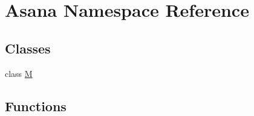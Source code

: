 \hypertarget{namespace_asana}{\section{\-Asana \-Namespace \-Reference}
\label{namespace_asana}
}
\subsection*{\-Classes}
\begin{DoxyCompactItemize}
\item 
class \hyperlink{class_asana_1_1_m}{\-M}
\end{DoxyCompactItemize}
\subsection*{\-Functions}
